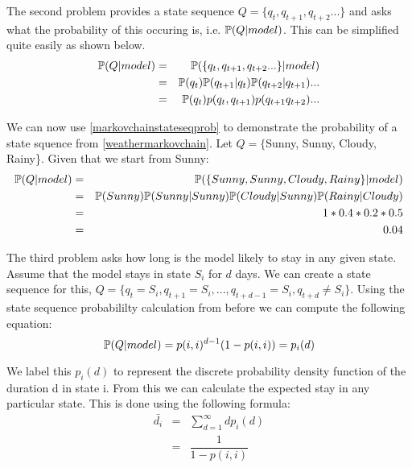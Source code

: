 The second problem provides a state sequence $Q = \{q_t,q_{t+1},q_{t+2}...\}$ and asks what the probability of this occuring is, i.e. $\mathbb{P} (Q | model)$. This can be simplified quite easily as shown below.
\begin{eqnarray}
    \label{markovchainstateseqprob}
    \mathbb{P} (Q | model) & = & \mathbb{P} (\{q_t,q_{t+1},q_{t+2}...\} | model) \\
                      & = & \mathbb{P} (q_{t}) \mathbb{P} (q_{t+1}| q_{t}) \mathbb{P} (q_{t+2}| q_{t+1})... \\
                      & = & \mathbb{P} (q_t) p(q_t,q_{t+1}) p(q_{t+1}q_{t+2}) ...
\end{eqnarray}

\begin{example}
    We can now use \ref{markovchainstateseqprob} to demonstrate the probability of a state squence from \ref{weathermarkovchain}. Let $Q = \{$Sunny, Sunny, Cloudy, Rainy\}. Given that we start from Sunny: 
    \begin{eqnarray}
        \mathbb{P} (Q | model) & = & \mathbb{P} (\{Sunny, Sunny, Cloudy, Rainy\} | model) \\
                          & = & \mathbb{P} (Sunny) \mathbb{P} (Sunny| Sunny) \mathbb{P} (Cloudy| Sunny) \mathbb{P} (Rainy| Cloudy)\\
                          & = & 1 * 0.4 * 0.2 * 0.5 \\
                          & = & 0.04 
    \end{eqnarray}
\end{example}

The third problem asks how long is the model likely to stay in any given state. Assume that the model stays in state $S_i$ for $d$ days. We can create a state sequence for this, $Q = \{q_t = S_i ,q_{t+1} = S_i, ..., q_{t+d-1} = S_i, q_{t+d} \neq S_i\}$.  Using the state sequence probabililty calculation from before we can compute the following equation:
\begin{equation}
    \mathbb{P} (Q | model) = p(i,i)^{d-1} (1 - p(i,i)) = p_i(d)
\end{equation}

We label this $p_i(d)$ to represent the discrete probability density function of the duration d in state i. From this we can calculate the expected stay in any particular state. This is done using the following formula:
\begin{eqnarray}
    \label{expectedstay}
    \bar{d_i} & = & \sum_{d=1}^{\infty} d  p_i(d) \\
              & = & \dfrac{1}{1 - p(i,i)}
\end{eqnarray} 

